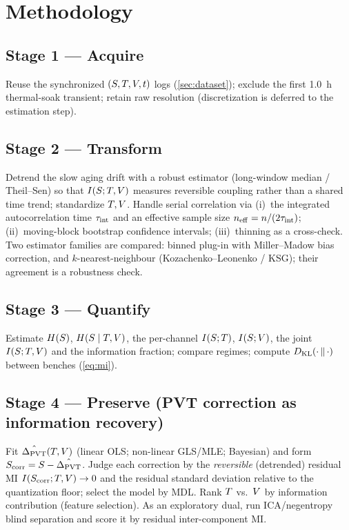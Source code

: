 \section{Methodology}
\label{sec:methodology}


\subsection{Stage 1 --- Acquire}
Reuse the synchronized $(S,T,V,t)$ logs (\cref{sec:dataset});
exclude the first 1.0~h thermal-soak transient; retain raw resolution
(discretization is deferred to the estimation step).

\subsection{Stage 2 --- Transform}
Detrend the slow aging drift with a robust estimator (long-window median /
Theil--Sen) so that $I\!\left(S ; T,V\right)$ measures reversible coupling rather
than a shared time trend; standardize $T,V$. Handle serial correlation
via (i)~the integrated autocorrelation time $\tau_{\mathrm{int}}$ and an effective sample
size $n_{\mathrm{eff}}=n/(2\tau_{\mathrm{int}})$; (ii)~moving-block bootstrap confidence intervals;
(iii)~thinning as a cross-check. Two estimator families are compared:
binned plug-in with Miller--Madow bias correction, and $k$-nearest-neighbour
(Kozachenko--Leonenko / KSG); their agreement is a robustness check.

\subsection{Stage 3 --- Quantify}
Estimate $H\!\left(S\right)$, $H\!\left(S\mid T,V\right)$, the per-channel
$I\!\left(S ; T\right)$, $I\!\left(S ; V\right)$, the joint $I\!\left(S ; T,V\right)$ and
the information fraction; compare regimes; compute $D_{\mathrm{KL}}\!\left(\cdot \,\|\, \cdot\right)$ between
benches (\cref{eq:mi}).

\subsection{Stage 4 --- Preserve (PVT correction as information recovery)}
Fit $\hat{\Delta_{\mathrm{PVT}}}(T,V)$ (linear OLS; non-linear GLS/MLE; Bayesian) and
form $S_{\mathrm{corr}}=S-\hat{\Delta_{\mathrm{PVT}}}$. Judge each correction by the \emph{reversible}
(detrended) residual MI $I\!\left(S_{\mathrm{corr}} ; T,V\right)\to 0$ and the residual
standard deviation relative to the quantization floor; select the model by MDL.
Rank $T$ vs.\ $V$ by information contribution (feature selection). As an
exploratory dual, run ICA/negentropy blind separation and score it by residual
inter-component MI.

